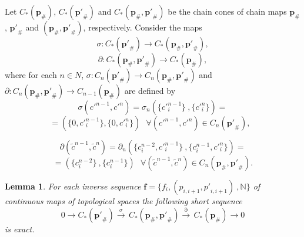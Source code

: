 \documentclass[10pt]{article}
\newtheorem{lemma}[theorem]{Lemma}
\theoremstyle{definition}
\begin{document}
Let ${{C}_{*}}( {{\mathbf{p}}_{\#}} )$, ${{C}_{*}}( \mathbf{p'}_{\#})$ and ${{C}_{*}}( {{\mathbf{p}}_{\#}},\mathbf{p'}_{\#} )$ be the chain cones of chain maps ${{\mathbf{p}}_{\#}}$, $\mathbf{p'}_{\#}$ and $( {{\mathbf{p}}_{\#}},\mathbf{p'}_{\#} )$, respectively. Consider the maps
$$\sigma :{{C}_{*}}( \mathbf{p'}_{\#} )\to {{C}_{*}}( {{\mathbf{p}}_{\#}},\mathbf{p'}_{\#}),$$                                    
$$\partial :{{C}_{*}}( {{\mathbf{p}}_{\#}},\mathbf{p'}_{\#} )\to {{C}_{*}}( {{\mathbf{p}}_{\#}} ) ,$$                                     
where for each $n\in N$,  ${{\sigma }}:{{C}_{n}}( \mathbf{p'}_{\#})\to {{C}_{n}}( {{\mathbf{p}}_{\#}},\mathbf{p'}_{\#})$ and ${{\partial }}:{{C}_{n}}( {{\mathbf{p}}_{\#}},\mathbf{p'}_{\#})\to {{C}_{n-1}}( {{\mathbf{p}}_{\#}} )$ are defined by
	$${{\sigma }}( {{c'}^{n-1}},{{c'}^{n}} )={{\sigma }_{n}}( \{{c'}_{i}^{n-1}\}~,\{ {c'}_{i}^{n} \} )=$$
$$=( \{ 0, {c'}_{i}^{n-1} \},\{ 0,{c'}_{i}^{n}\})~~~\forall ( {{c'}^{n-1}},{{c'}^{n}} )\in {{C}_{n}}( \mathbf{p'}_{\#}),~~~$$    
	
	
	$${{\partial }}( {{{\tilde{c}}}^{n-1}},{{{\tilde{c}}}^{n}} )={{\partial }_{n}}( \{c_{i}^{n-2},{c'}_{i}^{n-1}\}~,\{c_{i}^{n-1},{c'}_{i}^{n}\} )=$$
		$$=( \{c_{i}^{n-2} \}~, \{ c_{i}^{n-1} \} )~~~\forall ( {{{\tilde{c}}}^{n-1}},{{{\tilde{c}}}^{n}} )\in {{C}_{n}}( {{\mathbf{p}}_{\#}},\mathbf{p'}_{\#}).$$

\begin{lemma} For each inverse sequence $\mathbf{f}= \{ {{f}_{i}},({{p}_{i,i+1}},{p'}_{i,i+1})~, \mathbb{N} \}$  of continuous maps of topological spaces the following short sequence
	$$0\to {{C}_{*}}( \mathbf{p'}_{\#} )\overset{\sigma }{\mathop{\to }}\,{{C}_{*}}( {{\mathbf{p}}_{\#}},\mathbf{p'}_{\#} )\overset{\partial }{\mathop{\to }}\,{{C}_{*}}( {{\mathbf{p}}_{\#}} )\to 0$$
is exact.
\end{lemma}
\end{document}
